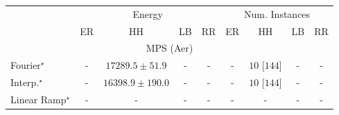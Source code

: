 \begin{tabular}{l|cccc|cccc|}
\toprule
& \multicolumn{4}{c|}{Energy} & \multicolumn{4}{c|}{Num. Instances} \\
            & ER & HH & LB & RR & ER & HH & LB & RR \\
\midrule
\multicolumn{9}{c}{\rule{0pt}{8pt}MPS (Aer)} \\
\midrule
Fourier$^\star$ & {\cellcolor[HTML]{000000}} \color[HTML]{F1F1F1} {\cellcolor{white}} \color{black} - & {\cellcolor[HTML]{4D004B}} \color[HTML]{F1F1F1} $17289.5\pm 51.9$ & {\cellcolor[HTML]{000000}} \color[HTML]{F1F1F1} {\cellcolor{white}} \color{black} - & {\cellcolor[HTML]{000000}} \color[HTML]{F1F1F1} {\cellcolor{white}} \color{black} - & {\cellcolor[HTML]{000000}} \color[HTML]{F1F1F1} {\cellcolor{white}} \color{black} - & {\cellcolor[HTML]{49006A}} \color[HTML]{F1F1F1} $10$ [$144$] & {\cellcolor[HTML]{000000}} \color[HTML]{F1F1F1} {\cellcolor{white}} \color{black} - & {\cellcolor[HTML]{000000}} \color[HTML]{F1F1F1} {\cellcolor{white}} \color{black} - \\
Interp.$^\star$ & {\cellcolor[HTML]{000000}} \color[HTML]{F1F1F1} {\cellcolor{white}} \color{black} - & {\cellcolor[HTML]{F7FCFD}} \color[HTML]{000000} $16398.9\pm 190.0$ & {\cellcolor[HTML]{000000}} \color[HTML]{F1F1F1} {\cellcolor{white}} \color{black} - & {\cellcolor[HTML]{000000}} \color[HTML]{F1F1F1} {\cellcolor{white}} \color{black} - & {\cellcolor[HTML]{000000}} \color[HTML]{F1F1F1} {\cellcolor{white}} \color{black} - & {\cellcolor[HTML]{49006A}} \color[HTML]{F1F1F1} $10$ [$144$] & {\cellcolor[HTML]{000000}} \color[HTML]{F1F1F1} {\cellcolor{white}} \color{black} - & {\cellcolor[HTML]{000000}} \color[HTML]{F1F1F1} {\cellcolor{white}} \color{black} - \\
Linear Ramp$^\star$ & {\cellcolor[HTML]{000000}} \color[HTML]{F1F1F1} {\cellcolor{white}} \color{black} - & {\cellcolor[HTML]{000000}} \color[HTML]{F1F1F1} {\cellcolor{white}} \color{black} - & {\cellcolor[HTML]{000000}} \color[HTML]{F1F1F1} {\cellcolor{white}} \color{black} - & {\cellcolor[HTML]{000000}} \color[HTML]{F1F1F1} {\cellcolor{white}} \color{black} - & {\cellcolor[HTML]{000000}} \color[HTML]{F1F1F1} {\cellcolor{white}} \color{black} - & {\cellcolor[HTML]{000000}} \color[HTML]{F1F1F1} {\cellcolor{white}} \color{black} - & {\cellcolor[HTML]{000000}} \color[HTML]{F1F1F1} {\cellcolor{white}} \color{black} - & {\cellcolor[HTML]{000000}} \color[HTML]{F1F1F1} {\cellcolor{white}} \color{black} - \\

\end{tabular}
